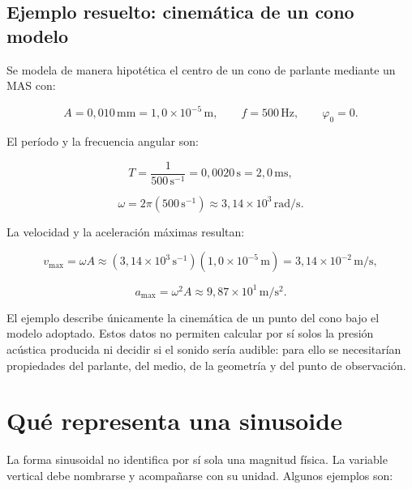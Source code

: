 \subsection{Ejemplo resuelto: cinemática de un cono modelo}
\label{sec:u3-ejemplo-mas}

Se modela de manera hipotética el centro de un cono de parlante mediante un
MAS con:

\[
    A=0{,}010\,\text{mm}=1{,}0\times10^{-5}\,\text{m},
    \qquad
    f=500\,\text{Hz},
    \qquad
    \varphi_0=0.
\]

El período y la frecuencia angular son:

\[
    T=\frac{1}{500\,\text{s}^{-1}}
      =0{,}0020\,\text{s}
      =2{,}0\,\text{ms},
\]

\[
    \omega=2\pi(500\,\text{s}^{-1})
           \approx3{,}14\times10^{3}\,\text{rad}/\text{s}.
\]

La velocidad y la aceleración máximas resultan:

\[
    v_{\max}=\omega A
        \approx
        (3{,}14\times10^{3}\,\text{s}^{-1})
        (1{,}0\times10^{-5}\,\text{m})
        =3{,}14\times10^{-2}\,\text{m}/\text{s},
\]

\[
    a_{\max}=\omega^{2}A
        \approx
        9{,}87\times10^{1}\,\text{m}/\text{s}^{2}.
\]

El ejemplo describe únicamente la cinemática de un punto del cono bajo el
modelo adoptado. Estos datos no permiten calcular por sí solos la presión
acústica producida ni decidir si el sonido sería audible: para ello se
necesitarían propiedades del parlante, del medio, de la geometría y del punto
de observación.

\section{Qué representa una sinusoide}
\label{sec:u3-variable-sinusoide}

La forma sinusoidal no identifica por sí sola una magnitud física. La variable
vertical debe nombrarse y acompañarse con su unidad. Algunos ejemplos son:

